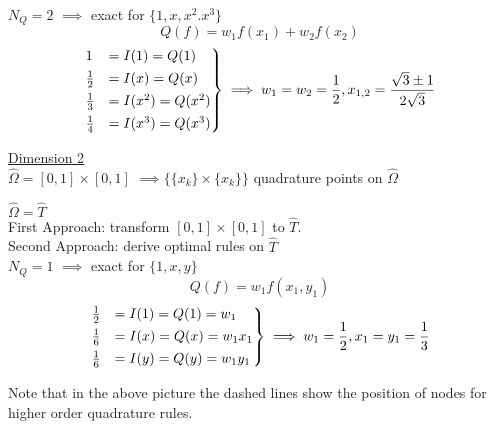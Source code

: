 $N_Q = 2$ $\implies$ exact for $\{1,x,x^2.x^3\}$
\begin{equation*}
	Q(f)= w_1f(x_1) + w_2f(x_2)
\end{equation*}
\begin{align*}
\begin{rcases}
	1 &= I(1)=Q(1)  \\
	\frac{1}{2} &= I(x)= Q(x)  \\
	\frac{1}{3}&=I(x^2)= Q(x^2) \\
	\frac{1}{4}&=I(x^3)= Q(x^3)
\end{rcases} \implies w_1=w_2= \frac{1}{2}, x_{1,2} = \frac{\sqrt{3}\pm 1}{2\sqrt{3}}
\end{align*}

\underline{Dimension 2}\\
$\hat{\Omega} = [0,1]\times [0,1]$ $\implies \{\{x_k\}\times\{x_k\} \}$ quadrature points on $\hat{\Omega}$

$\hat{\Omega} = \hat{T}$\\
First Approach: transform $[0,1]\times [0,1]$ to $\hat{T}$.\\

Second Approach: derive optimal rules on $\hat{T}$\\
$N_Q = 1$ $\implies$ exact for $\{1,x,y\}$
\begin{equation*}
Q(f)= w_1f(x_1,y_1)
\end{equation*}
\begin{align*}
\begin{rcases}
\frac{1}{2}&= I(1)= Q(1) = w_1  \\
\frac{1}{6}&= I(x)= Q(x) = w_1x_1  \\
\frac{1}{6}&= I(y)= Q(y) = w_1y_1\\
\end{rcases} \implies w_1= \frac{1}{2}, x_1=y_1 = \frac{1}{3}
\end{align*}

Note that in the above picture the dashed lines show the position of nodes for higher order quadrature rules.